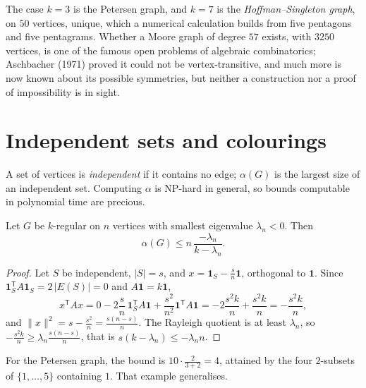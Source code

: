The case $k=3$ is the Petersen graph, and $k=7$ is the \emph{Hoffman--Singleton graph}, on $50$ vertices, unique, which a numerical calculation
builds from five pentagons and five pentagrams. Whether a Moore graph of degree $57$ exists, with $3250$ vertices, is one of the
famous open problems of algebraic combinatorics; Aschbacher (1971) proved it could not be vertex-transitive, and much more is now
known about its possible symmetries, but neither a construction nor a proof of impossibility is in sight.

\section{Independent sets and colourings}

A set of vertices is \emph{independent} if it contains no edge; $\alpha(G)$ is the largest size of an independent set. Computing
$\alpha$ is NP-hard in general, so bounds computable in polynomial time are precious.

\begin{theorem}\label{linear:thm:hoffman}
Let $G$ be $k$-regular on $n$ vertices with smallest eigenvalue $\lambda_n<0$. Then
\[
\alpha(G)\le n\,\frac{-\lambda_n}{k-\lambda_n}.
\]
\end{theorem}
\begin{proof}
Let $S$ be independent, $|S|=s$, and $x=\mathbf 1_S-\frac sn\mathbf 1$, orthogonal to $\mathbf 1$. Since $\mathbf 1_S^{\mathsf T}A\mathbf 1_S=2\,
|E(S)|=0$ and $A\mathbf 1=k\mathbf 1$,
\[
x^{\mathsf T}Ax=0-2\frac sn\,\mathbf 1_S^{\mathsf T}A\mathbf 1+\frac{s^2}{n^2}\mathbf 1^{\mathsf T}A\mathbf 1=-2\frac{s^2k}n+\frac{s^2k}n=-\frac{s^2k}n,
\]
and $\|x\|^2=s-\frac{s^2}n=\frac{s(n-s)}n$. The Rayleigh quotient is at least $\lambda_n$, so $-\frac{s^2k}n\ge\lambda_n\frac{s(n-s)}n$,
that is $s(k-\lambda_n)\le-\lambda_nn$.
\end{proof}

For the Petersen graph, the bound is $10\cdot\frac2{3+2}=4$, attained by the four $2$-subsets of $\{1,\dots,5\}$ containing $1$.
That example generalises.

